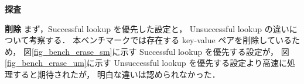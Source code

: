 \leavevmode \newline

%
{\bf 探査}
\samepage\newline\indent
\leavevmode \newline

%
{\bf 削除}
\samepage\newline\indent
まず，Successful lookup を優先した設定と，
Unsuccessful lookup の違いについて考察する．
本ベンチマークでは存在する key-value ペアを削除しているため，
図\ref{fig_bench_erase_sm}に示す Successful lookup を優先する設定が，
図\ref{fig_bench_erase_um}に示す Unsuccessful lookup を優先する設定より高速に処理すると期待されたが，
明白な違いは認められなかった．
\leavevmode \newline


